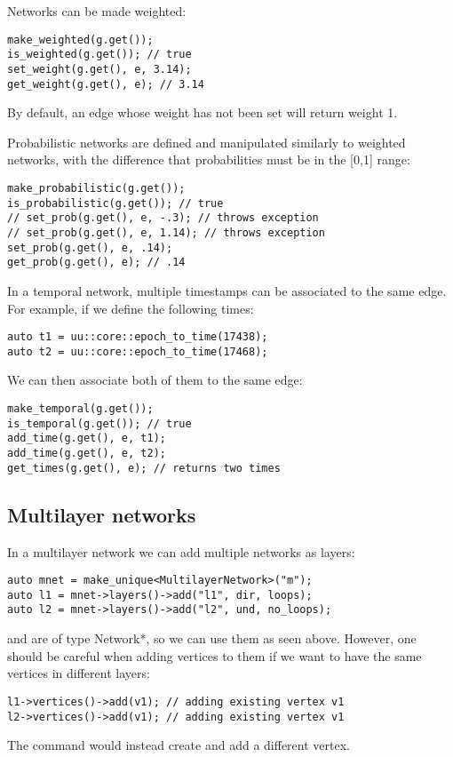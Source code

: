 Networks can be made weighted:
\begin{lstlisting}[style=c++]    
make_weighted(g.get());
is_weighted(g.get()); // true
set_weight(g.get(), e, 3.14);
get_weight(g.get(), e); // 3.14
\end{lstlisting}
By default, an edge whose weight has not been set will return weight 1.

Probabilistic networks are defined and manipulated similarly to weighted networks, with the difference that probabilities must be in the [0,1] range:
\begin{lstlisting}[style=c++]
make_probabilistic(g.get());
is_probabilistic(g.get()); // true
// set_prob(g.get(), e, -.3); // throws exception
// set_prob(g.get(), e, 1.14); // throws exception
set_prob(g.get(), e, .14);
get_prob(g.get(), e); // .14
\end{lstlisting}

In a temporal network, multiple timestamps can be associated to the same edge. For example, if we define the following times:
\begin{lstlisting}[style=c++]
auto t1 = uu::core::epoch_to_time(17438);
auto t2 = uu::core::epoch_to_time(17468);
\end{lstlisting}
We can then associate both of them to the same edge:
\begin{lstlisting}[style=c++]
make_temporal(g.get());
is_temporal(g.get()); // true
add_time(g.get(), e, t1);
add_time(g.get(), e, t2);
get_times(g.get(), e); // returns two times
\end{lstlisting}


\subsection{Multilayer networks}

In a multilayer network we can add multiple networks as layers:
\begin{lstlisting}[style=c++]
auto mnet = make_unique<MultilayerNetwork>("m");
auto l1 = mnet->layers()->add("l1", dir, loops);
auto l2 = mnet->layers()->add("l2", und, no_loops);
\end{lstlisting}

 and  are of type Network*, so we can use them as seen above. However, one should be careful when adding vertices to them if we want to have the same vertices in different layers:
\begin{lstlisting}[style=c++]
l1->vertices()->add(v1); // adding existing vertex v1
l2->vertices()->add(v1); // adding existing vertex v1
\end{lstlisting}
The command  would instead create and add a different vertex.

